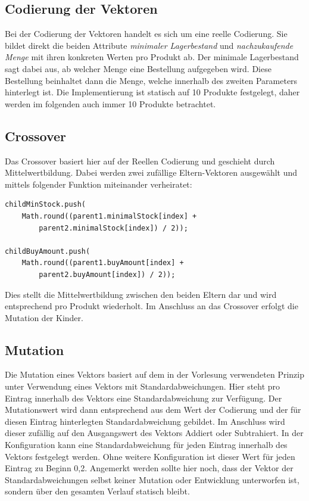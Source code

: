 \documentclass[]{scrartcl}
\begin{document}
\subsection{Codierung der Vektoren}
\label{codierung}
Bei der Codierung der Vektoren handelt es sich um eine reelle Codierung. Sie bildet direkt die beiden Attribute \textit{minimaler Lagerbestand} und \textit{nachzukaufende Menge} mit ihren konkreten Werten pro Produkt ab. Der minimale Lagerbestand sagt dabei aus, ab welcher Menge eine Bestellung aufgegeben wird. Diese Bestellung beinhaltet dann die Menge, welche innerhalb des zweiten Parameters hinterlegt ist. Die Implementierung ist statisch auf 10 Produkte festgelegt, daher werden im folgenden auch immer 10 Produkte betrachtet.

\subsection{Crossover}
\label{crossover}
Das Crossover basiert hier auf der Reellen Codierung und geschieht durch Mittelwertbildung. Dabei werden zwei zufällige Eltern-Vektoren ausgewählt und mittels folgender Funktion miteinander verheiratet:

\begin{lstlisting}[backgroundcolor=\color{lightgray}]
childMinStock.push(
	Math.round((parent1.minimalStock[index] +
		parent2.minimalStock[index]) / 2));
		
childBuyAmount.push(
	Math.round((parent1.buyAmount[index] +
		parent2.buyAmount[index]) / 2));
\end{lstlisting}

Dies stellt die Mittelwertbildung zwischen den beiden Eltern dar und wird entsprechend pro Produkt wiederholt. Im Anschluss an das Crossover erfolgt die Mutation der Kinder.

\subsection{Mutation}
\label{mutation}
Die Mutation eines Vektors basiert auf dem in der Vorlesung verwendeten Prinzip unter Verwendung eines Vektors mit Standardabweichungen. Hier steht pro Eintrag innerhalb des Vektors eine Standardabweichung zur Verfügung. Der Mutationswert wird dann entsprechend aus dem Wert der Codierung und der für diesen Eintrag hinterlegten Standardabweichung gebildet. Im Anschluss wird dieser zufällig auf den Ausgangswert des Vektors Addiert oder Subtrahiert. In der Konfiguration kann eine Standardabweichung für jeden Eintrag innerhalb des Vektors festgelegt werden. Ohne weitere Konfiguration ist dieser Wert für jeden Eintrag zu Beginn 0,2. Angemerkt werden sollte hier noch, dass der Vektor der Standardabweichungen selbst keiner Mutation oder Entwicklung unterworfen ist, sondern über den gesamten Verlauf statisch bleibt.
\end{document}
